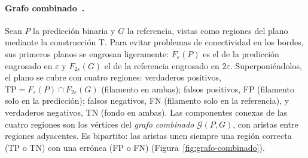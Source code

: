 \paragraph{Grafo combinado~\cite[§2.1]{lux2025}.} Sean $P$ la predicción
binaria y $G$ la referencia, vistas como regiones del plano mediante la
construcción T. Para evitar problemas de conectividad en los bordes, sus
primeros planos se engrosan ligeramente: $F_\varepsilon(P)$ es el de la
predicción engrosado en $\varepsilon$ y $F_{2\varepsilon}(G)$ el de la
referencia engrosado en $2\varepsilon$. Superponiéndolos, el plano se
cubre con cuatro regiones: verdaderos positivos,
$\mathrm{TP}=F_\varepsilon(P)\cap F_{2\varepsilon}(G)$ (filamento en ambas);
falsos positivos, FP (filamento solo en la predicción); falsos negativos,
FN (filamento solo en la referencia), y verdaderos negativos, TN (fondo en
ambas). Las componentes conexas de las cuatro regiones son los vértices
del \emph{grafo combinado} $\mathcal{G}(P,G)$, con aristas entre regiones
adyacentes. Es bipartito: las aristas unen siempre una región correcta
(TP o TN) con una errónea (FP o FN) (Figura~\ref{fig:grafo-combinado}).

